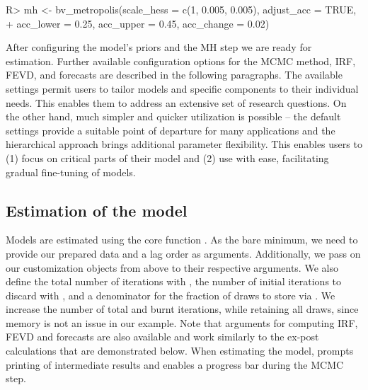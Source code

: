 \documentclass[article,nojss]{jss} %
\begin{document}
\begin{Schunk}
\begin{Sinput}
R> mh <- bv_metropolis(scale_hess = c(1, 0.005, 0.005), adjust_acc = TRUE,
+    acc_lower = 0.25, acc_upper = 0.45, acc_change = 0.02)
\end{Sinput}
\end{Schunk}

After configuring the model's priors and the MH step we are ready for estimation. Further available configuration options for the MCMC method, IRF, FEVD, and forecasts are described in the following paragraphs.
The available settings permit users to tailor models and specific components to their individual needs. This enables them to address an extensive set of research questions.
On the other hand, much simpler and quicker utilization is possible -- the default settings provide a suitable point of departure for many applications and the hierarchical approach brings additional parameter flexibility.
This enables users to (1) focus on critical parts of their model and (2) use  with ease, facilitating gradual fine-tuning of models.

\subsection{Estimation of the model}

Models are estimated using the core function .
As the bare minimum, we need to provide our prepared data and a lag order as arguments. Additionally, we pass on our customization objects from above to their respective arguments.
We also define the total number of iterations with , the number of initial iterations to discard with , and a denominator for the fraction of draws to store via . We increase the number of total and burnt iterations, while retaining all draws, since memory is not an issue in our example.
Note that arguments for computing IRF, FEVD and forecasts are also available and work similarly to the ex-post calculations that are demonstrated below.
When estimating the model,  prompts printing of intermediate results and enables a progress bar during the MCMC step.
\end{document}
